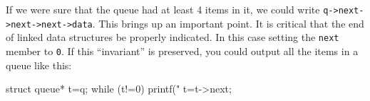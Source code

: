 \begin{center}
\end{center}


If we were sure that the queue had at least 4 items in it, we could write \lstinline!q->next->next->next->data!.
This brings up an important point.
It is critical that the end of linked data structures be properly indicated.
In this case setting the \texttt{next} member to \texttt{0}.
If this ``invariant'' is preserved, you could output all the items in a queue like this:
\begin{codeblock}
struct queue* t=q;
while (t!=0) {
    printf("%
    t=t->next;
}
\end{codeblock}

